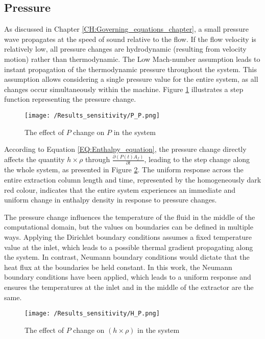 \documentclass[../Article_Sensitivity_Analsysis.tex]{subfiles}
\begin{document}
	
	\subsection{Pressure}
	
	As discussed in Chapter \ref{CH:Governing_equations_chapter}, a small pressure wave propagates at the speed of sound relative to the flow. If the flow velocity is relatively low, all pressure changes are hydrodynamic (resulting from velocity motion) rather than thermodynamic. The Low Mach-number assumption leads to instant propagation of the thermodynamic pressure throughout the system. This assumption allows considering a single pressure value for the entire system, as all changes occur simultaneously within the machine. Figure \ref{fig:Sensitivty_P_P} illustrates a step function representing the pressure change.
	
	\begin{figure}[h!]
		\centering
		\texttt{[image: /Results\_sensitivity/P\_P.png]}
		\caption{The effect of $P$ change on $P$ in the system}
		\label{fig:Sensitivty_P_P}
	\end{figure}
	
	According to Equation \ref{EQ:Enthalpy_equation}, the pressure change directly affects the quantity $h \times \rho$ through $\frac{\partial (P(t) A_f)}{\partial t}$, leading to the step change along the whole system, as presented in Figure \ref{fig:Sensitivty_P_H}. The uniform response across the entire extraction column length and time, represented by the homogeneously dark red colour, indicates that the entire system experiences an immediate and uniform change in enthalpy density in response to pressure changes. 
	
	The pressure change influences the temperature of the fluid in the middle of the computational domain, but the values on boundaries can be defined in multiple ways. Applying the Dirichlet boundary conditions assumes a fixed temperature value at the inlet, which leads to a possible thermal gradient propagating along the system. In contrast, Neumann boundary conditions would dictate that the heat flux at the boundaries be held constant. In this work, the Neumann boundary conditions have been applied, which leads to a uniform response and ensures the temperatures at the inlet and in the middle of the extractor are the same.
	
	\begin{figure}[h!]
		\centering
		\texttt{[image: /Results\_sensitivity/H\_P.png]}
		\caption{The effect of $P$ change on $(h \times \rho)$ in the system}
		\label{fig:Sensitivty_P_H}
	\end{figure}
	
\end{document}
